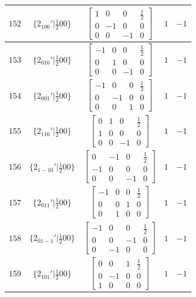 \documentclass[fleqn,8pt]{jsarticle}
\begin{document}
\begin{longtable}{ccccc}
$ 152 $ & $ \{2{}_{100}{}'|\frac{1}{2} 0 0\} $ & $ \begin{bmatrix} 1 & 0 & 0 & \frac{1}{2} \\ 0 & -1 & 0 & 0 \\ 0 & 0 & -1 & 0 \end{bmatrix} $ & $ 1 $ & $ -1 $ \\ \hline
$ 153 $ & $ \{2{}_{010}{}'|\frac{1}{2} 0 0\} $ & $ \begin{bmatrix} -1 & 0 & 0 & \frac{1}{2} \\ 0 & 1 & 0 & 0 \\ 0 & 0 & -1 & 0 \end{bmatrix} $ & $ 1 $ & $ -1 $ \\ \hline
$ 154 $ & $ \{2{}_{001}{}'|\frac{1}{2} 0 0\} $ & $ \begin{bmatrix} -1 & 0 & 0 & \frac{1}{2} \\ 0 & -1 & 0 & 0 \\ 0 & 0 & 1 & 0 \end{bmatrix} $ & $ 1 $ & $ -1 $ \\ \hline
$ 155 $ & $ \{2{}_{110}{}'|\frac{1}{2} 0 0\} $ & $ \begin{bmatrix} 0 & 1 & 0 & \frac{1}{2} \\ 1 & 0 & 0 & 0 \\ 0 & 0 & -1 & 0 \end{bmatrix} $ & $ 1 $ & $ -1 $ \\ \hline
$ 156 $ & $ \{2{}_{1-10}{}'|\frac{1}{2} 0 0\} $ & $ \begin{bmatrix} 0 & -1 & 0 & \frac{1}{2} \\ -1 & 0 & 0 & 0 \\ 0 & 0 & -1 & 0 \end{bmatrix} $ & $ 1 $ & $ -1 $ \\ \hline
$ 157 $ & $ \{2{}_{011}{}'|\frac{1}{2} 0 0\} $ & $ \begin{bmatrix} -1 & 0 & 0 & \frac{1}{2} \\ 0 & 0 & 1 & 0 \\ 0 & 1 & 0 & 0 \end{bmatrix} $ & $ 1 $ & $ -1 $ \\ \hline
$ 158 $ & $ \{2{}_{01-1}{}'|\frac{1}{2} 0 0\} $ & $ \begin{bmatrix} -1 & 0 & 0 & \frac{1}{2} \\ 0 & 0 & -1 & 0 \\ 0 & -1 & 0 & 0 \end{bmatrix} $ & $ 1 $ & $ -1 $ \\ \hline
$ 159 $ & $ \{2{}_{101}{}'|\frac{1}{2} 0 0\} $ & $ \begin{bmatrix} 0 & 0 & 1 & \frac{1}{2} \\ 0 & -1 & 0 & 0 \\ 1 & 0 & 0 & 0 \end{bmatrix} $ & $ 1 $ & $ -1 $ \\ \hline

\end{longtable}
\end{document}
